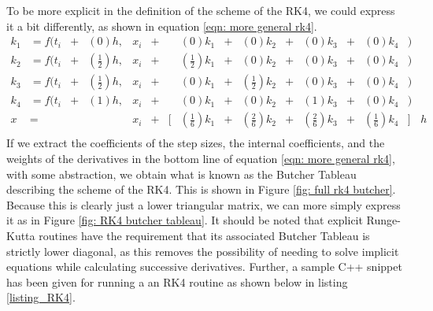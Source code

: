 \documentclass[onecolumn,titlepage,letterpaper,10pt]{article}
\begin{document}
To be more explicit in the definition of the scheme of the RK4, we could express
it a bit differently, as shown in equation \eqref{eqn: more general rk4}.
\begin{equation}
\begin{aligned}
	k_1 &= f(t_i & + &(          0)h, &x_i& + & &           (0)k_1& + &           (0)k_2& + &           (0)k_3& + &           (0)k_4&)&\\
    k_2 &= f(t_i & + &(\frac{1}{2})h, &x_i& + & & (\frac{1}{2})k_1& + &           (0)k_2& + &           (0)k_3& + &           (0)k_4&)&\\
    k_3 &= f(t_i & + &(\frac{1}{2})h, &x_i& + & &           (0)k_1& + & (\frac{1}{2})k_2& + &           (0)k_3& + &           (0)k_4&)&\\
    k_4 &= f(t_i & + &(          1)h, &x_i& + & &           (0)k_1& + &           (0)k_2& + &           (1)k_3& + &           (0)k_4&)&\\
	x   &=       &   &                &x_i& + &[& (\frac{1}{6})k_1& + & (\frac{2}{6})k_2& + & (\frac{2}{6})k_3& + & (\frac{1}{6})k_4 &]&h\\
    \label{eqn: more general rk4}
\end{aligned}
\end{equation}
If we extract the coefficients of the step sizes, the internal
coefficients, and the weights of the derivatives in the bottom line of equation
\eqref{eqn: more general rk4}, with some abstraction, we obtain what is known
as the Butcher Tableau describing the scheme of the RK4. This is shown in Figure
\ref{fig: full rk4 butcher}. Because this is clearly just a lower triangular
matrix, we can more simply express it as in Figure \ref{fig: RK4 butcher tableau}.
It should be noted that explicit Runge-Kutta routines have the requirement that
its associated Butcher Tableau is strictly lower diagonal, as this removes
the possibility of
needing to solve implicit equations while calculating successive derivatives.
Further, a sample C++ snippet has been given for running a an RK4 routine as
shown below in listing \ref{listing_RK4}.
\end{document}
